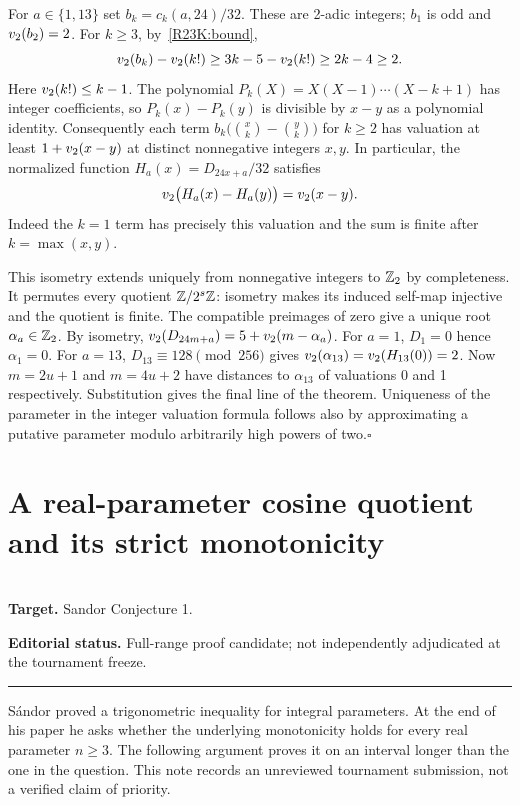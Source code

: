 \documentclass[11pt,a4paper]{article}
\begin{document}
For $a\in\{1,13\}$ set $b_k=c_k(a,24)/32$. These are 2-adic integers;
$b_1$ is odd and $v_2(b_2)=2$. For $k\ge3$, by~\eqref{R23K:bound},
\[
 v_2(b_k)-v_2(k!)\ge 3k-5-v_2(k!)\ge 2k-4\ge2.
\]
Here $v_2(k!)\le k-1$. The polynomial
$P_k(X)=X(X-1)\cdots(X-k+1)$ has integer coefficients, so
$P_k(x)-P_k(y)$ is divisible by $x-y$ as a polynomial identity.
Consequently each term
$b_k\bigl(\binom{x}{k}-\binom{y}{k}\bigr)$ for $k\ge2$
has valuation at least $1+v_2(x-y)$ at distinct nonnegative
integers $x,y$. In particular, the normalized function
$H_a(x)=D_{24x+a}/32$ satisfies
\[
 v_2\bigl(H_a(x)-H_a(y)\bigr)=v_2(x-y).
\]
Indeed the $k=1$ term has precisely this valuation and the sum is finite
after $k=\max(x,y)$.

This isometry extends uniquely from nonnegative integers to
$\mathbb Z_2$ by completeness. It permutes every quotient
$\mathbb Z/2^s\mathbb Z$: isometry makes its induced self-map injective and the
quotient is finite. The compatible preimages of zero give a unique
root $\alpha_a\in\mathbb Z_2$. By isometry,
$v_2(D_{24m+a})=5+v_2(m-\alpha_a)$.
For $a=1$, $D_1=0$ hence $\alpha_1=0$.
For $a=13$, $D_{13}\equiv128\pmod{256}$ gives
$v_2(\alpha_{13})=v_2(H_{13}(0))=2$. Now
$m=2u+1$ and $m=4u+2$ have distances to $\alpha_{13}$ of valuations
0 and 1 respectively. Substitution gives the final line of the theorem.
Uniqueness of the parameter in the integer valuation formula follows
also by approximating a putative parameter modulo arbitrarily high
powers of two.\hfill$\square$
\endgroup


\clearpage

\section{A real-parameter cosine quotient and its strict monotonicity}
\label{section:R23T}
\\[3pt]
\noindent\textbf{Target.} Sandor Conjecture 1.

\noindent\textbf{Editorial status.} Full-range proof candidate; not independently adjudicated at the tournament freeze. 

\smallskip\hrule\medskip



\begingroup
\newcommand{\sinc}{\operatorname{sinc}}
\setcounter{equation}{0}
\renewcommand{\theequation}{\thesection.\arabic{equation}}
\renewcommand{\theHequation}{R23T.\arabic{equation}}
\noindent
S\'andor \cite{R23T:plain1} proved a trigonometric inequality for integral parameters. At
the end of his paper he asks whether the underlying monotonicity holds
for every real parameter $n\ge3$. The following argument proves it on
an interval longer than the one in the question. This note records an
unreviewed tournament submission, not a verified claim of priority.
\end{document}
